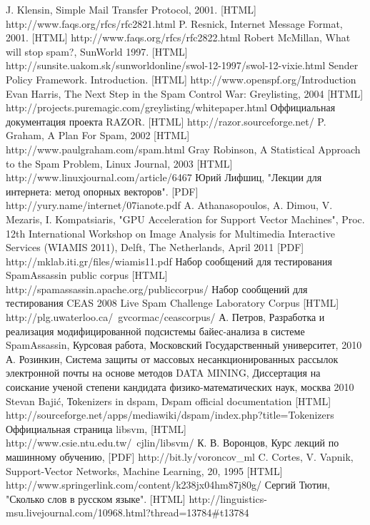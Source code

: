 \newpage
\begin{thebibliography}{99}
 J. Klensin, Simple Mail Transfer Protocol, 2001. [HTML] http://www.faqs.org/rfcs/rfc2821.html 
 P. Resnick, Internet Message Format, 2001. [HTML] http://www.faqs.org/rfcs/rfc2822.html
 Robert McMillan, What will stop spam?, SunWorld 1997. [HTML] http://sunsite.uakom.sk/sunworldonline/swol-12-1997/swol-12-vixie.html
 Sender Policy Framework. Introduction.  [HTML] http://www.openspf.org/Introduction
 Evan Harris, The Next Step in the Spam Control War: Greylisting, 2004 [HTML] http://projects.puremagic.com/greylisting/whitepaper.html
 Оффициальная документация проекта RAZOR. [HTML] http://razor.sourceforge.net/
 P. Graham, A Plan For Spam, 2002 [HTML] http://www.paulgraham.com/spam.html
 Gray Robinson, A Statistical Approach to the Spam Problem, Linux Journal, 2003 [HTML] http://www.linuxjournal.com/article/6467 
 Юрий Лифшиц, "Лекции для интернета: метод опорных векторов". [PDF] http://yury.name/internet/07ianote.pdf
A. Athanasopoulos, A. Dimou, V. Mezaris, I. Kompatsiaris, "GPU Acceleration for Support Vector Machines", Proc. 12th International Workshop on Image Analysis for Multimedia Interactive Services (WIAMIS 2011), Delft, The Netherlands, April 2011 [PDF] http://mklab.iti.gr/files/wiamis11.pdf
 Набор сообщений для тестирования SpamAssassin public corpus [HTML] http://spamassassin.apache.org/publiccorpus/
 Набор сообщений для тестирования CEAS 2008 Live Spam Challenge Laboratory Corpus [HTML] http://plg.uwaterloo.ca/~gvcormac/ceascorpus/
 А. Петров, Разработка и реализация модифицированной подсистемы байес-анализа в системе SpamAssassin, Курсовая работа, Московский Государственный университет, 2010
 А. Розинкин, Система защиты от массовых несанкционированных рассылок электронной почты на основе методов DATA MINING, Диссертация на соискание ученой степени кандидата физико-математических наук, москва 2010 
 Stevan Bajić, Тоkenizers in dspam, Dspam official documentation [HTML] http://sourceforge.net/apps/mediawiki/dspam/index.php?title=Tokenizers
Оффициальная страница libsvm, [HTML] http://www.csie.ntu.edu.tw/~cjlin/libsvm/
 К. В. Воронцов, Курс лекций по машинному обучению, [PDF] http://bit.ly/voroncov\_ml 
 C. Cortes, V. Vapnik, Support-Vector Networks, Machine Learning, 20, 1995 [HTML] http://www.springerlink.com/content/k238jx04hm87j80g/
Сергий Тютин, "Сколько слов в русском языке". [HTML] http://linguistics-msu.livejournal.com/10968.html?thread=13784\#t13784
\end{thebibliography}
